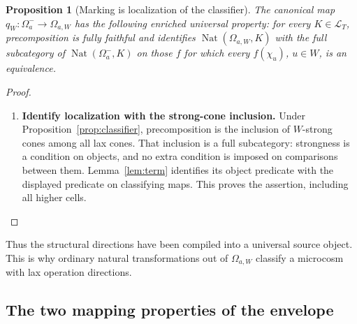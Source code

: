 \documentclass[oneside]{article}
\theoremstyle{plain}
\newtheorem{proposition}[theorem]{Proposition}
\theoremstyle{definition}
\theoremstyle{remark}
\newcommand{\LT}{\mathcal L_T}
\newcommand{\Nat}{\operatorname{Nat}}
\begin{document}
\begin{proposition}[Marking is localization of the classifier]\label{prop:marklocal}
The canonical map $q_W:\Omega_a^-\longrightarrow\Omega_{a,W}$ has the following enriched universal property: for every $K\in\LT$, precomposition is fully faithful and identifies $\Nat(\Omega_{a,W},K)$ with the full subcategory of $\Nat(\Omega_a^-,K)$ on those $f$ for which every $f(\chi_u)$, $u\in W$, is an equivalence.
\end{proposition}
\begin{proof}
\leavevmode
\begin{enumerate}
\item \textbf{Identify localization with the strong-cone inclusion.} Under Proposition~\ref{prop:classifier}, precomposition is the inclusion of $W$-strong cones among all lax cones. That inclusion is a full subcategory: strongness is a condition on objects, and no extra condition is imposed on comparisons between them. Lemma~\ref{lem:term} identifies its object predicate with the displayed predicate on classifying maps. This proves the assertion, including all higher cells.\qedhere
\end{enumerate}
\end{proof}

Thus the structural directions have been compiled into a universal source object. This is why ordinary natural transformations out of $\Omega_{a,W}$ classify a microcosm with lax operation directions.

\subsection{The two mapping properties of the envelope}
\end{document}
